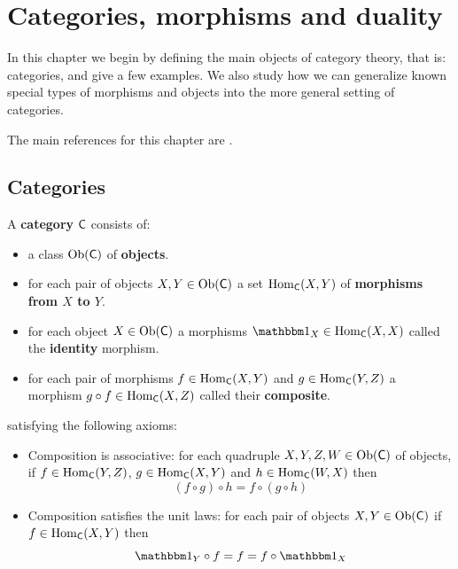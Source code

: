\documentclass[../../main]{subfiles}
\begin{document}
\chapter{Categories, morphisms and duality}

In this chapter we begin by defining the main objects of category theory, that is: categories, and give a few examples.
We also study how we can generalize known special types of morphisms and objects into the more general setting of categories.

The main references for this chapter are \cite{riehlCategoryTheoryContext, maclaneCategoriesWorkingMathematician1978, aluffiAlgebraChapter02009}.

\section{Categories}

\begin{definition}[Category]\label{def:category}
  A \textbf{category} \(\mathsf{C}\) consists of:
  \begin{itemize}
    \item a class \(\operatorname{Ob}(\mathsf{C})\) of \textbf{objects}.
    \item for each pair of objects \(X, Y \in \operatorname{Ob}(\mathsf{C})\) a set \(\operatorname{Hom}_{\mathsf{C}}(X, Y)\) of \textbf{morphisms from \(X\) to \(Y\)}.
    \item for each object \(X \in \operatorname{Ob}(\mathsf{C})\) a morphisms \(\id_{X} \in \Hom_{\category{C}}(X, X)\) called the \textbf{identity} morphism.
    \item for each pair of morphisms \(f \in \operatorname{Hom}_{\mathsf{C}}(X, Y)\) and \(g \in \operatorname{Hom}_{\mathsf{C}}(Y, Z)\) a morphism \(g \circ f \in \operatorname{Hom}_{\mathsf{C}}(X, Z)\) called their \textbf{composite}.
  \end{itemize}
  satisfying the following axioms:
  \begin{itemize}
    \item Composition is associative: for each quadruple \(X, Y, Z, W \in \operatorname{Ob}(\mathsf{C})\) of objects, if \(f \in \operatorname{Hom}_{\mathsf{C}}(Y, Z)\), \(g \in \operatorname{Hom}_{\mathsf{C}}(X, Y)\) and \(h \in \operatorname{Hom}_{\mathsf{C}}(W, X)\) then
          \begin{equation*}
            (f \circ g) \circ h = f \circ (g \circ h)
          \end{equation*}
    \item Composition satisfies the unit laws: for each pair of objects \(X, Y \in \operatorname{Ob}(\mathsf{C})\) if \(f \in \operatorname{Hom}_{\mathsf{C}}(X, Y)\) then
          \begin{equation*}
            \id_{Y} \circ f = f = f \circ \id_{X}
          \end{equation*}
  \end{itemize}
\end{definition}
\end{document}
